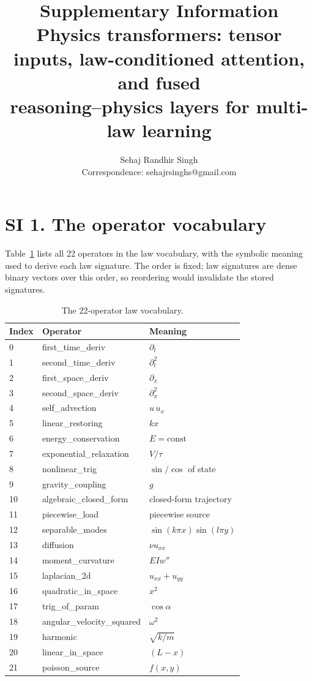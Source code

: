 \documentclass[11pt,a4paper]{article}
\title{\bfseries Supplementary Information\\
Physics transformers: tensor inputs, law-conditioned attention, and fused\\
reasoning--physics layers for multi-law learning}
\author{Sehaj Randhir Singh \\ \small Correspondence: sehajrsinghs@gmail.com}
\date{}
\begin{document}
\maketitle

\section*{SI 1. The operator vocabulary}
\label{si:vocab}

Table~\ref{tab:si1} lists all 22 operators in the law vocabulary, with the
symbolic meaning used to derive each law signature. The order is fixed; law
signatures are dense binary vectors over this order, so reordering would
invalidate the stored signatures.

\begin{table}[h]
\centering
\caption{The 22-operator law vocabulary.}
\label{tab:si1}
\small
\begin{tabular}{@{}lll@{}}
\toprule
Index & Operator & Meaning \\
\midrule
0 & first\_time\_deriv & $\partial_t$ \\
1 & second\_time\_deriv & $\partial_t^2$ \\
2 & first\_space\_deriv & $\partial_x$ \\
3 & second\_space\_deriv & $\partial_x^2$ \\
4 & self\_advection & $u\,u_x$ \\
5 & linear\_restoring & $k x$ \\
6 & energy\_conservation & $E = \mathrm{const}$ \\
7 & exponential\_relaxation & $V/\tau$ \\
8 & nonlinear\_trig & $\sin/\cos$ of state \\
9 & gravity\_coupling & $g$ \\
10 & algebraic\_closed\_form & closed-form trajectory \\
11 & piecewise\_load & piecewise source \\
12 & separable\_modes & $\sin(k\pi x)\sin(l\pi y)$ \\
13 & diffusion & $\nu u_{xx}$ \\
14 & moment\_curvature & $EI w''$ \\
15 & laplacian\_2d & $u_{xx} + u_{yy}$ \\
16 & quadratic\_in\_space & $x^2$ \\
17 & trig\_of\_param & $\cos\alpha$ \\
18 & angular\_velocity\_squared & $\omega^2$ \\
19 & harmonic & $\sqrt{k/m}$ \\
20 & linear\_in\_space & $(L - x)$ \\
21 & poisson\_source & $f(x,y)$ \\
\bottomrule
\end{tabular}
\end{table}
\end{document}
